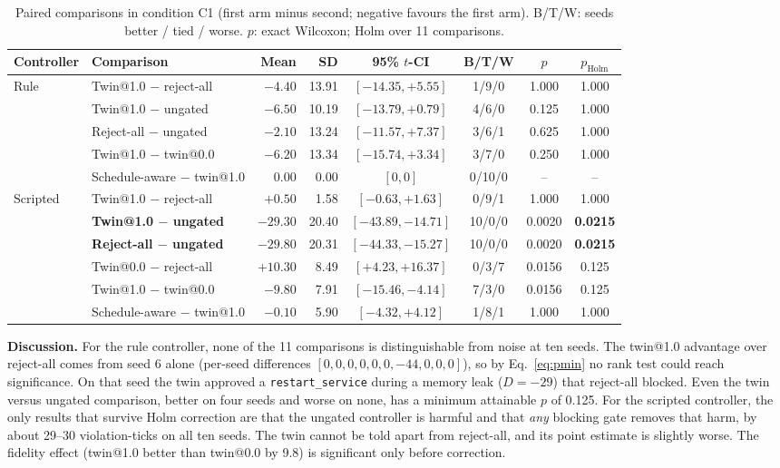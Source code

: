 \documentclass[conference]{IEEEtran}
\begin{document}
\begin{table}[t]
\centering
\caption{Paired comparisons in condition C1 (first arm minus second; negative favours the first arm). B/T/W: seeds better / tied / worse. $p$: exact Wilcoxon; Holm over 11 comparisons.}
\label{tab:paired}
\small
\setlength{\tabcolsep}{4pt}
\begin{tabular}{@{}llrrcccc@{}}
\toprule
Controller & Comparison & Mean & SD & 95\% $t$-CI & B/T/W & $p$ & $p_{\text{Holm}}$ \\
\midrule
\multirow{5}{*}{Rule}
 & Twin@1.0 $-$ reject-all & $-4.40$ & 13.91 & $[-14.35, +5.55]$ & 1/9/0 & 1.000 & 1.000 \\
 & Twin@1.0 $-$ ungated    & $-6.50$ & 10.19 & $[-13.79, +0.79]$ & 4/6/0 & 0.125 & 1.000 \\
 & Reject-all $-$ ungated  & $-2.10$ & 13.24 & $[-11.57, +7.37]$ & 3/6/1 & 0.625 & 1.000 \\
 & Twin@1.0 $-$ twin@0.0   & $-6.20$ & 13.34 & $[-15.74, +3.34]$ & 3/7/0 & 0.250 & 1.000 \\
 & Schedule-aware $-$ twin@1.0 & 0.00 & 0.00 & $[0, 0]$ & 0/10/0 & -- & -- \\
\midrule
\multirow{6}{*}{Scripted}
 & Twin@1.0 $-$ reject-all & $+0.50$ & 1.58 & $[-0.63, +1.63]$ & 0/9/1 & 1.000 & 1.000 \\
 & \textbf{Twin@1.0 $-$ ungated} & $\mathbf{-29.30}$ & 20.40 & $[-43.89, -14.71]$ & 10/0/0 & 0.0020 & \textbf{0.0215} \\
 & \textbf{Reject-all $-$ ungated} & $\mathbf{-29.80}$ & 20.31 & $[-44.33, -15.27]$ & 10/0/0 & 0.0020 & \textbf{0.0215} \\
 & Twin@0.0 $-$ reject-all & $+10.30$ & 8.49 & $[+4.23, +16.37]$ & 0/3/7 & 0.0156 & 0.125 \\
 & Twin@1.0 $-$ twin@0.0   & $-9.80$ & 7.91 & $[-15.46, -4.14]$ & 7/3/0 & 0.0156 & 0.125 \\
 & Schedule-aware $-$ twin@1.0 & $-0.10$ & 5.90 & $[-4.32, +4.12]$ & 1/8/1 & 1.000 & 1.000 \\
\bottomrule
\end{tabular}
\end{table}

\textbf{Discussion.} For the rule controller, none of the 11 comparisons is distinguishable from noise at ten seeds. The twin@1.0 advantage over reject-all comes from seed 6 alone (per-seed differences $[0,0,0,0,0,0,-44,0,0,0]$), so by Eq.~\eqref{eq:pmin} no rank test could reach significance. On that seed the twin approved a \texttt{restart\_service} during a memory leak ($D = -29$) that reject-all blocked. Even the twin versus ungated comparison, better on four seeds and worse on none, has a minimum attainable $p$ of 0.125. For the scripted controller, the only results that survive Holm correction are that the ungated controller is harmful and that \emph{any} blocking gate removes that harm, by about 29--30 violation-ticks on all ten seeds. The twin cannot be told apart from reject-all, and its point estimate is slightly worse. The fidelity effect (twin@1.0 better than twin@0.0 by 9.8) is significant only before correction.
\end{document}
